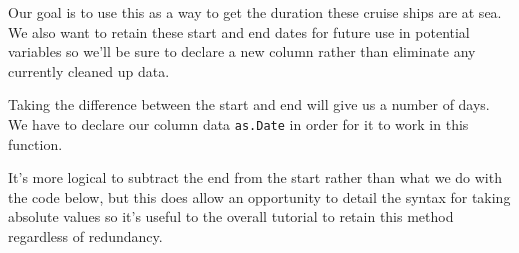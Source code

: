 \documentclass[
  11,
]{book}
\newenvironment{Shaded}{\begin{snugshade}}{\end{snugshade}}
\newcommand{\FunctionTok}[1]{\textcolor[rgb]{0.27,0.27,0.27}{\textbf{#1}}}
\newcommand{\NormalTok}[1]{#1}
\newcommand{\OtherTok}[1]{\textcolor[rgb]{0.37,0.37,0.37}{#1}}
\newcommand{\SpecialCharTok}[1]{\textcolor[rgb]{0.43,0.43,0.43}{\textbf{#1}}}
\begin{document}
Our goal is to use this as a way to get the duration these cruise ships are at sea. We also want to retain these start and end dates for future use in potential variables so we'll be sure to declare a new column rather than eliminate any currently cleaned up data.

Taking the difference between the start and end will give us a number of days. We have to declare our column data \texttt{as.Date} in order for it to work in this function.

It's more logical to subtract the end from the start rather than what we do with the code below, but this does allow an opportunity to detail the syntax for taking absolute values so it's useful to the overall tutorial to retain this method regardless of redundancy.

\begin{Shaded}
\end{Shaded}
\end{document}
